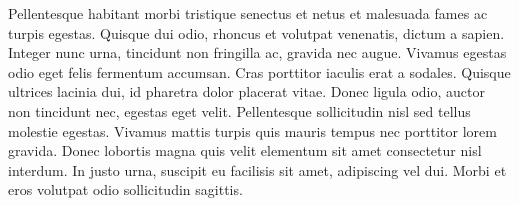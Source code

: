 Pellentesque habitant morbi tristique senectus et netus et malesuada fames ac turpis egestas. Quisque dui odio, rhoncus et volutpat venenatis, dictum a sapien. Integer nunc urna, tincidunt non fringilla ac, gravida nec augue. Vivamus egestas odio eget felis fermentum accumsan. Cras porttitor iaculis erat a sodales. Quisque ultrices lacinia dui, id pharetra dolor placerat vitae. Donec ligula odio, auctor non tincidunt nec, egestas eget velit. Pellentesque sollicitudin nisl sed tellus molestie egestas. Vivamus mattis turpis quis mauris tempus nec porttitor lorem gravida. Donec lobortis magna quis velit elementum sit amet consectetur nisl interdum. In justo urna, suscipit eu facilisis sit amet, adipiscing vel dui. Morbi et eros volutpat odio sollicitudin sagittis. 



